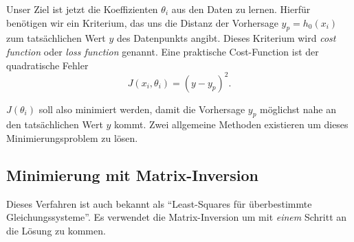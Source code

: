 Unser Ziel ist jetzt die Koeffizienten $\theta_i$ aus den Daten zu lernen. Hierfür
benötigen wir ein Kriterium, das uns die Distanz der Vorhersage $y_p = h_0(x_i)$ zum tatsächlichen
Wert $y$ des Datenpunkts angibt. Dieses Kriterium wird \emph{cost function} oder
\emph{loss function} genannt. Eine praktische Cost-Function ist der quadratische Fehler
\begin{equation}
J(x_i, \theta_i) = (y - y_p)^2.
\label{ml:regression:cost:sqerr}
\end{equation}

$J(\theta_i)$ soll also minimiert werden, damit die Vorhersage $y_p$ möglichst nahe an den
tatsächlichen Wert $y$ kommt. Zwei allgemeine Methoden existieren um dieses
Minimierungsproblem zu lösen.

\subsection{Minimierung mit Matrix-Inversion}

Dieses Verfahren ist auch bekannt als ``Least-Squares für überbestimmte
Gleichungssysteme''. Es verwendet die Matrix-Inversion um mit \emph{einem} Schritt an die
Lösung zu kommen.

